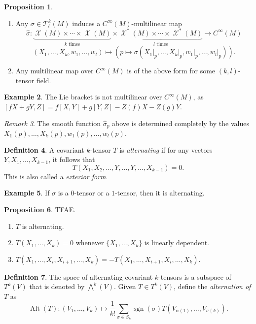 \documentclass[10pt,letterpaper,cm]{nupset}
\theoremstyle{definition}
\newtheorem{definition}{Definition}[subsection]
\newtheorem{exmp}[definition]{Example}
\theoremstyle{theorem}
\newtheorem{prop}[definition]{Proposition}
\theoremstyle{remark}
\newtheorem{remark}[definition]{Remark}
\newcommand{\T}{\mathcal T}
\newcommand{\1}{\mathbf{1}}
\newcommand{\0}{\vec 0}
\DeclareMathOperator{\Alt}{Alt}
\DeclareMathOperator{\sgn}{sgn}
\DeclareMathOperator{\vf}{\mathscr{X}}
\begin{document}
\begin{prop} $ $
\begin{enumerate}
\item Any $ \sigma \in \T_l^k(M)$ induces a $C^{\infty}(M)$-multilinear map $$\hat{\sigma} : \underbrace{\vf(M) \times \cdots \times \vf(M)}_{k \text{ times}} \times \underbrace{\vf^{\ast}(M) \times \cdots \times \vf^{\ast}(M)}_{l \text{ times}}\to C^{\infty}(M)$$  $$(X_1, \ldots, X_k, w_1, \ldots, w_l)\mapsto (p \mapsto \sigma (X_1\rvert_p, \ldots, X_k\rvert_p, w_1\rvert_p, \ldots, w_l\rvert_p)).$$
\item Any multilinear map over $C^{\infty}(M)$ is of the above form for some $(k,l)$-tensor field.
\end{enumerate}
\end{prop}

\begin{exmp}
The Lie bracket is not multilinear over $C^{\infty}(M)$, as $[fX + gY, Z] = f[X, Y] + g[Y, Z]-Z(f)X -Z(g)Y$.
\end{exmp}

\begin{remark}
The smooth function $\hat{\sigma}_p$ above is determined completely by  the values $X_1(p), \ldots, X_k(p), w_1(p), \ldots, w_l(p)$.
\end{remark}

\begin{definition}
A covariant $k$-tensor $T$ is \textit{alternating}  if for any vectors $Y, X_1, \ldots, X_{k-1}$, it follows that $$T(X_1, X_2, \ldots, Y, \ldots, Y, \ldots, X_{k-1}) =0.$$ This is also called a \textit{exterior form}.
\end{definition}

\begin{exmp}
If $\sigma$ is a $0$-tensor or a $1$-tensor, then it is alternating.
\end{exmp}

\begin{prop} TFAE.
\begin{enumerate}
\item $T$ is alternating.
\item $T(X_1, \ldots, X_k) =0$ whenever $\{X_1, \ldots,  X_k\}$ is linearly dependent.
\item $T(X_1, \ldots, X_i, X_{i+1}, \ldots, X_k) = -T(X_1, \ldots, X_{i+1}, X_{i}, \ldots, X_k)$.
\end{enumerate}
\end{prop}

\begin{definition}
The space of alternating covariant $k$-tensors is a subspace of $T^k(V)$ that is denoted by $\bigwedge^k(V)$. Given $T\in T^k(V)$, define the \textit{alternation of $T$} as $$\Alt(T) : (V_1, \ldots, V_k) \mapsto \frac{1}{k!} \sum_{\sigma \in S_k} \sgn(\sigma) T(V_{\alpha(1)}, \ldots, V_{\sigma(k)}).$$
\end{definition}
\end{document}

